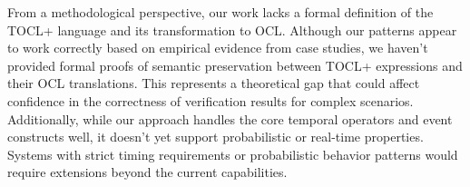 From a methodological perspective, our work lacks a formal definition of the TOCL+ 
language and its transformation to OCL. Although our patterns appear to work correctly 
based on empirical evidence from case studies, we haven't provided formal proofs of 
semantic preservation between TOCL+ expressions and their OCL translations. This 
represents a theoretical gap that could affect confidence in the correctness of 
verification results for complex scenarios. Additionally, while our approach handles 
the core temporal operators and event constructs well, it doesn't yet support 
probabilistic or real-time properties. Systems with strict timing requirements or 
probabilistic behavior patterns would require extensions beyond the current 
capabilities.